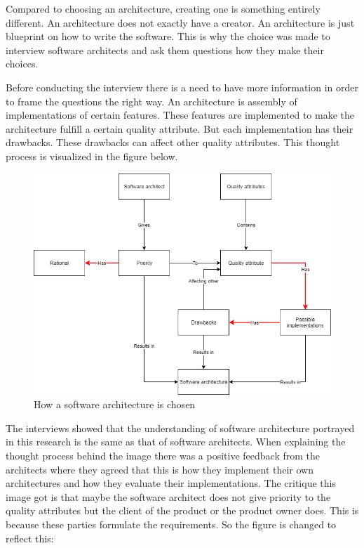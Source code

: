 Compared to choosing an architecture, creating one is something entirely different. An architecture does not exactly have a creator. An architecture is just blueprint on how to write the software. This is why the choice was made to interview software architects and ask them questions how they make their choices.

Before conducting the interview there is a need to have more information in order to frame the questions the right way. An architecture is assembly of implementations of certain features. These features are implemented to make the architecture fulfill a certain quality attribute. But each implementation has their drawbacks. These drawbacks can affect other quality attributes. This thought process is visualized in the figure below.

\begin{figure}[H]
	\includegraphics[width=\linewidth]{creating_architecture.png}
	\caption{How a software architecture is chosen}
\end{figure}

The interviews showed that the understanding of software architecture portrayed in this research is the same as that of software architects. When explaining the thought process behind the image there was a positive feedback from the architects where they agreed that this is how they implement their own architectures and how they evaluate their implementations. The critique this image got is that maybe the software architect does not give priority to the quality attributes but the client of the product or the product owner does. This is because these parties formulate the requirements. So the figure is changed to reflect this:


